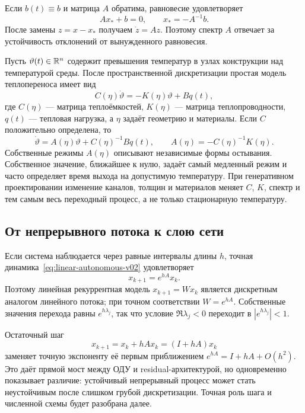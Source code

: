 Если $b(t)\equiv b$ и матрица $A$ обратима, равновесие удовлетворяет
\begin{equation}
\label{eq:linear-forced-equilibrium-v02}
Ax_*+b=0,
\qquad
x_*=-A^{-1}b.
\end{equation}
После замены $z=x-x_*$ получаем $\dot z=Az$. Поэтому спектр $A$ отвечает за устойчивость отклонений от вынужденного равновесия.

\begin{application}
Пусть $\vartheta(t)\in\mathbb{R}^n$ содержит превышения температур в узлах конструкции над температурой среды. После пространственной дискретизации простая модель теплопереноса имеет вид
\begin{equation}
\label{eq:thermal-design-linear-model-v02}
C(\eta)\dot\vartheta
=
-K(\eta)\vartheta+Bq(t),
\end{equation}
где $C(\eta)$ --- матрица теплоёмкостей, $K(\eta)$ --- матрица теплопроводности, $q(t)$ --- тепловая нагрузка, а $\eta$ задаёт геометрию и материалы. Если $C$ положительно определена, то
\[
\dot\vartheta
=A(\eta)\vartheta+C(\eta)^{-1}Bq(t),
\qquad
A(\eta)=-C(\eta)^{-1}K(\eta).
\]
Собственные режимы $A(\eta)$ описывают независимые формы остывания. Собственное значение, ближайшее к нулю, задаёт самый медленный режим и часто определяет время выхода на допустимую температуру. При генеративном проектировании изменение каналов, толщин и материалов меняет $C$, $K$, спектр и тем самым весь переходный процесс, а не только стационарную температуру.
\end{application}

\subsection{От непрерывного потока к слою сети}

Если система наблюдается через равные интервалы длины $h$, точная динамика~\eqref{eq:linear-autonomous-v02} удовлетворяет
\begin{equation}
\label{eq:exact-linear-discrete-step-v02}
x_{k+1}=e^{hA}x_k.
\end{equation}
Поэтому линейная рекуррентная модель $x_{k+1}=Wx_k$ является дискретным аналогом линейного потока; при точном соответствии $W=e^{hA}$. Собственные значения перехода равны $e^{h\lambda_j}$, так что условие $\Re\lambda_j<0$ переходит в $|e^{h\lambda_j}|<1$.

Остаточный шаг
\begin{equation}
\label{eq:euler-residual-bridge-v02}
x_{k+1}=x_k+hAx_k=(I+hA)x_k
\end{equation}
заменяет точную экспоненту её первым приближением $e^{hA}=I+hA+O(h^2)$. Это даёт прямой мост между ОДУ и residual-архитектурой, но одновременно показывает различие: устойчивый непрерывный процесс может стать неустойчивым после слишком грубой дискретизации. Точная роль шага и численной схемы будет разобрана далее.

